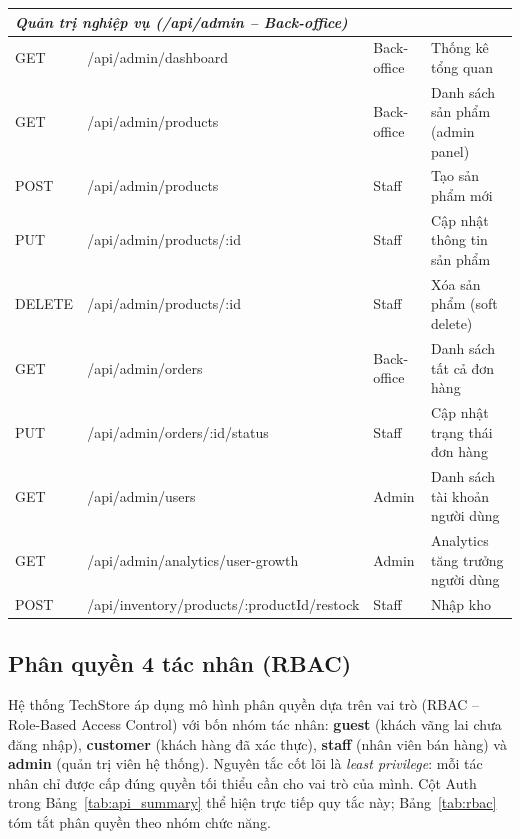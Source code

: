 {\begin{longtable}{|l|p{5.0cm}|l|p{4.5cm}|}
  \multicolumn{4}{|l|}{\textit{Quản trị nghiệp vụ (/api/admin -- Back-office)}} \\
  \hline
  GET & /api/admin/dashboard & Back-office & Thống kê tổng quan \\
  \hline
  GET & /api/admin/products & Back-office & Danh sách sản phẩm (admin panel) \\
  \hline
  POST & /api/admin/products & Staff & Tạo sản phẩm mới \\
  \hline
  PUT & /api/admin/products/:id & Staff & Cập nhật thông tin sản phẩm \\
  \hline
  DELETE & /api/admin/products/:id & Staff & Xóa sản phẩm (soft delete) \\
  \hline
  GET & /api/admin/orders & Back-office & Danh sách tất cả đơn hàng \\
  \hline
  PUT & /api/admin/orders/:id/status & Staff & Cập nhật trạng thái đơn hàng \\
  \hline
  GET & /api/admin/users & Admin & Danh sách tài khoản người dùng \\
  \hline
  GET & /api/admin/analytics/user-growth & Admin & Analytics tăng trưởng người dùng \\
  \hline
  POST & /api/inventory/\allowbreak products/\allowbreak :productId/restock & Staff & Nhập kho \\
  \hline
\end{longtable}
}

\subsection{Phân quyền 4 tác nhân (RBAC)}
\label{sec:c3_rbac}

Hệ thống TechStore áp dụng mô hình phân quyền dựa trên vai trò (RBAC -- Role-Based Access Control) với bốn nhóm tác nhân: \textbf{guest} (khách vãng lai chưa đăng nhập), \textbf{customer} (khách hàng đã xác thực), \textbf{staff} (nhân viên bán hàng) và \textbf{admin} (quản trị viên hệ thống). Nguyên tắc cốt lõi là \textit{least privilege}: mỗi tác nhân chỉ được cấp đúng quyền tối thiểu cần cho vai trò của mình. Cột Auth trong Bảng~\ref{tab:api_summary} thể hiện trực tiếp quy tắc này; Bảng~\ref{tab:rbac} tóm tắt phân quyền theo nhóm chức năng.

